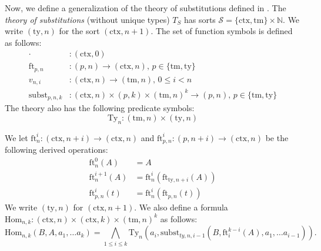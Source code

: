 \documentclass[reqno]{amsart}
\theoremstyle{definition}
\theoremstyle{remark}
\newcommand{\fs}[1]{\mathrm{#1}}
\newcommand{\subst}{\fs{subst}}
\newcommand{\Hom}{\fs{Hom}}
\newcommand{\emptyCtx}{\cdot}
\newcommand{\ft}{\fs{ft}}
\newcommand{\ty}{\fs{ty}}
\newcommand{\Ty}{\fs{Ty}}
\newcommand{\ctx}{\fs{ctx}}
\newcommand{\tm}{\fs{tm}}
\numberwithin{figure}{section}
\begin{document}
Now, we define a generalization of the theory of substitutions defined in \cite{alg-tt}.
The \emph{theory of substitutions} (without unique types) $T_S$ has sorts $\mathcal{S} = \{ \ctx, \tm \} \times \mathbb{N}$.
We write $(\ty,n)$ for the sort $(\ctx,n+1)$.
The set of function symbols is defined as follows:
\begin{align*}
\emptyCtx      & : (\ctx,0) \\
\ft_{p,n}      & : (p,n) \to (\ctx,n) \text{, } p \in \{ \tm, \ty \} \\
v_{n,i}        & : (\ctx,n) \to (\tm,n) \text{, } 0 \leq i < n \\
\subst_{p,n,k} & : (\ctx,n) \times (p,k) \times (\tm,n)^k \to (p,n) \text{, } p \in \{ \tm, \ty \}
\end{align*}
The theory also has the following predicate symbols:
\[ \Ty_n : (\tm,n) \times (\ty,n) \]

We let $\ft^i_n : (\ctx,n+i) \to (\ctx,n)$ and $\ft^i_{p,n} : (p,n+i) \to (\ctx,n)$ be the following derived operations:
\begin{align*}
\ft^0_n(A)      & = A \\
\ft^{i+1}_n(A)  & = \ft^i_n(\ft_{\ty,n+i}(A)) \\
\ft^i_{p,n}(t) & = \ft^i_n(\ft_{p,n}(t))
\end{align*}
We write $(\ty,n)$ for $(\ctx,n+1)$.
We also define a formula $\Hom_{n,k} : (\ctx,n) \times (\ctx,k) \times (\tm,n)^k$ as follows:
\[ \Hom_{n,k}(B, A, a_1, \ldots a_k) = \bigwedge_{1 \leq i \leq k} \Ty_n(a_i, \subst_{ty,n,i-1}(B, \ft^{k-i}_i(A), a_1, \ldots a_{i-1})). \]
\end{document}
